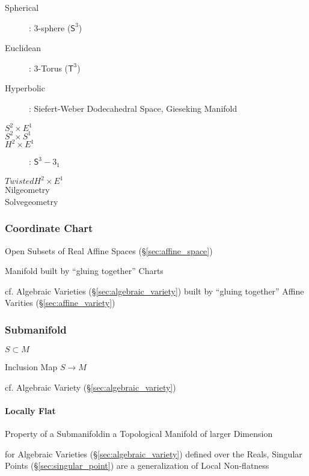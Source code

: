 \begin{description}
  \item [Spherical]: 3-sphere ($\mathsf{S}^3$)
  \item [Euclidean]: 3-Torus ($\mathsf{T}^3$)
  \item [Hyperbolic]: Siefert-Weber Dodecahedral Space, Gieseking
  Manifold
  \item [$S^2 \times E^1$]
  \item [$S^2 \times S^1$]
  \item [$H^2 \times E^1$]: $\mathsf{S}^3 - 3_1$
  \item [$Twisted H^2 \times E^1$]
  \item [Nilgeometry]
  \item [Solvegeometry]
\end{description}



\subsubsection{Coordinate Chart}\label{sec:coordinate_chart}

Open Subsets of Real Affine Spaces (\S\ref{sec:affine_space})

Manifold built by ``gluing together'' Charts

cf. Algebraic Varieties (\S\ref{sec:algebraic_variety}) built by ``gluing
together'' Affine Varities (\S\ref{sec:affine_variety})



\subsubsection{Submanifold}\label{sec:submanifold}

$S \subset M$

Inclusion Map $S \rightarrow M$

cf. Algebraic Variety (\S\ref{sec:algebraic_variety})



\paragraph{Locally Flat}\label{sec:locally_flat}\hfill

Property of a Submanifoldin a Topological Manifold of larger Dimension

for Algebraic Varieties (\S\ref{sec:algebraic_variety}) defined over the Reals,
Singular Points (\S\ref{sec:singular_point}) are a generalization of Local
Non-flatness



